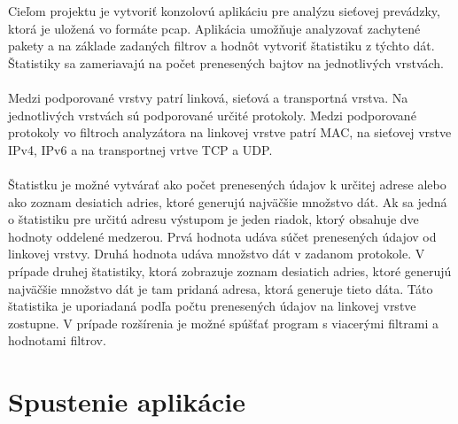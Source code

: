 \documentclass[10pt,a4paper,final]{article}
\begin{document}
\noindent Cieľom projektu je vytvoriť konzolovú aplikáciu pre analýzu sieťovej prevádzky, ktorá je uložená vo formáte pcap. Aplikácia umožňuje analyzovať zachytené pakety a na základe zadaných filtrov a hodnôt vytvoriť štatistiku z týchto dát. Štatistiky sa zameriavajú na počet prenesených bajtov na jednotlivých vrstvách.
\\\\
Medzi podporované vrstvy patrí linková, sieťová a transportná vrstva. Na jednotlivých vrstvách sú podporované určité protokoly. Medzi podporované protokoly vo filtroch analyzátora na linkovej vrstve patrí MAC, na sieťovej vrstve IPv4, IPv6 a na transportnej vrtve TCP a UDP.
\\\\
Štatistku je možné vytvárať ako počet prenesených údajov k určitej adrese alebo ako zoznam desiatich adries, ktoré generujú najväčšie množstvo dát. Ak sa jedná o štatistiku pre určitú adresu výstupom je jeden riadok, ktorý obsahuje dve hodnoty oddelené medzerou. Prvá hodnota udáva súčet prenesených údajov od linkovej vrstvy. Druhá hodnota udáva množstvo dát v zadanom protokole. V prípade druhej štatistiky, ktorá zobrazuje zoznam desiatich adries, ktoré generujú najväčšie množstvo dát je tam pridaná adresa, ktorá generuje tieto dáta. Táto štatistika je uporiadaná podľa počtu prenesených údajov na linkovej vrstve zostupne. V prípade rozšírenia je možné spúšťať program s viacerými filtrami a hodnotami filtrov.

\section{Spustenie aplikácie}
\end{document}

